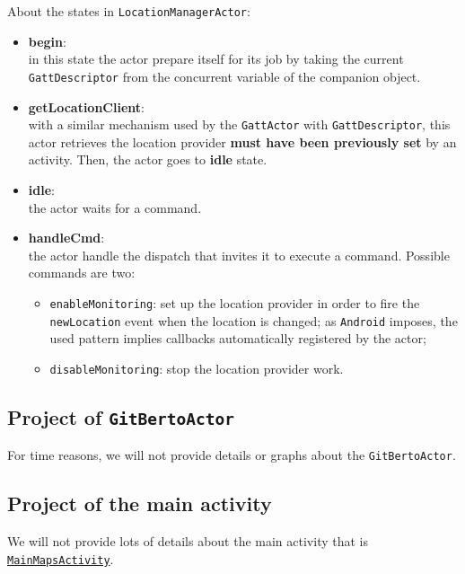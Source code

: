 About the states in \texttt{LocationManagerActor}:
\begin{itemize}
	\item \textbf{begin}:\\
	in this state the actor prepare itself for its job by taking the current \texttt{GattDescriptor} from the concurrent variable of the  companion object.
	
	\item \textbf{getLocationClient}:\\
	with a similar mechanism used by the \texttt{GattActor} with \texttt{GattDescriptor}, this actor retrieves the location provider \textbf{must have been previously set} by an activity. Then, the actor goes to \textbf{idle} state.
	
	\item \textbf{idle}:\\
	the actor waits for a command.
	
	\item \textbf{handleCmd}:\\
	the actor handle the dispatch that invites it to execute a command. Possible commands are two:
	\begin{itemize}
		\item \texttt{enableMonitoring}: set up the location provider in order to fire the \texttt{newLocation} event when the location is changed; as \texttt{Android} imposes, the used pattern implies callbacks automatically registered by the actor;
		
		\item \texttt{disableMonitoring}: stop the location provider work.
	\end{itemize}
	
\end{itemize}

\subsection{Project of \texttt{GitBertoActor}}

For time reasons, we will not provide details or graphs about the \texttt{GitBertoActor}.

\subsection{Project of the main activity}

We will not provide lots of details about the main activity that is \href{https://github.com/LucaLand/MobileSystemsProject-LL/blob/0.9.1/app/src/main/java/it/unibo/mobilesystems/MainMapsActivity.kt}{\texttt{MainMapsActivity}}.

